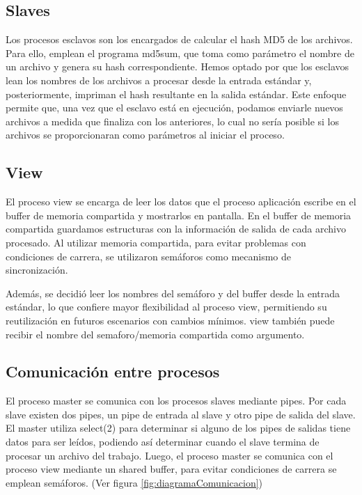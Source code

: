 \documentclass{article}
\begin{document}
\subsection{Slaves}
Los procesos esclavos son los encargados de calcular el hash MD5 de los archivos. Para ello, emplean el programa md5sum, que toma como parámetro el nombre de un archivo y genera su hash correspondiente. Hemos optado por que los esclavos lean los nombres de los archivos a procesar desde la entrada estándar y, posteriormente, impriman el hash resultante en la salida estándar. Este enfoque permite que, una vez que el esclavo está en ejecución, podamos enviarle nuevos archivos a medida que finaliza con los anteriores, lo cual no sería posible si los archivos se proporcionaran como parámetros al iniciar el proceso.

\subsection{View}

El proceso view se encarga de leer los datos que el proceso aplicación escribe en el buffer de memoria compartida y mostrarlos en pantalla. En el buffer de memoria compartida guardamos estructuras con la información de salida de cada archivo procesado. Al utilizar memoria compartida, para evitar problemas con condiciones de carrera, se utilizaron semáforos como mecanismo de sincronización. 

Además, se decidió leer los nombres del semáforo y del buffer desde la entrada estándar, lo que confiere mayor flexibilidad al proceso view, permitiendo su reutilización en futuros escenarios con cambios mínimos. view también puede recibir el nombre del semaforo/memoria compartida como argumento.

\subsection{Comunicación entre procesos}

El proceso master se comunica con los procesos slaves mediante pipes. Por cada slave existen dos pipes, un pipe de entrada al slave y otro pipe de salida del slave. El master utiliza select(2) para determinar si alguno de los pipes de salidas tiene datos para ser leídos, podiendo así determinar cuando el slave termina de procesar un archivo del trabajo. Luego, el proceso master se comunica con el proceso view mediante un shared buffer, para evitar condiciones de carrera se emplean semáforos. (Ver figura \ref{fig:diagramaComunicacion})
\end{document}
